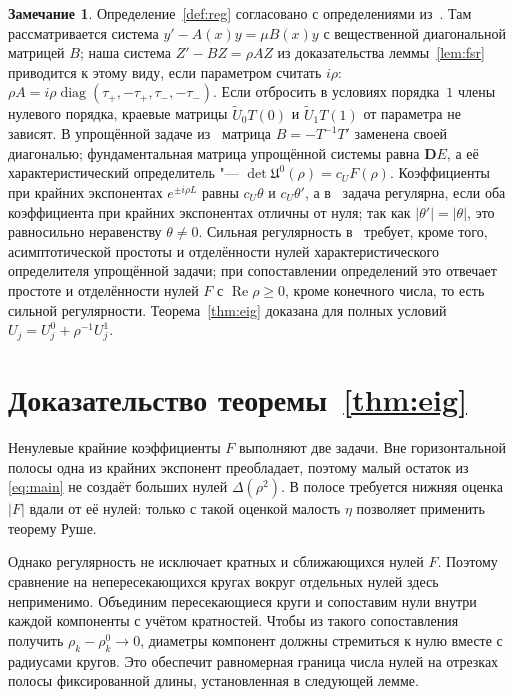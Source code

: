 \documentclass[12pt,a4paper]{article}
\numberwithin{equation}{section}
\theoremstyle{definition}
\newtheorem{remark}{Замечание}
\newcommand{\abs}[1]{\lvert#1\rvert}
\newcommand{\Ree}{\operatorname{Re}}
\newcommand{\Uf}{\mathfrak U}
\newcommand{\Dd}{\mathbf D}
\begin{document}
\begin{remark}\label{rem:Sh}
Определение~\ref{def:reg} согласовано с определениями из~\cite[с.~798]{Sh}. Там рассматривается
система $y'-A(x)y=\mu B(x)y$ с вещественной диагональной матрицей $B$; наша система
$Z'-BZ=\rho AZ$ из доказательства леммы~\ref{lem:fsr} приводится к этому виду, если параметром
считать $i\rho$: $\rho A=i\rho\operatorname{diag}(\tau_+,-\tau_+,\tau_-,-\tau_-)$. Если отбросить в
условиях порядка~$1$ члены нулевого порядка, краевые матрицы $\widetilde U_0T(0)$ и
$\widetilde U_1T(1)$ от параметра не зависят. В упрощённой задаче из~\cite{Sh} матрица
$B=-T^{-1}T'$ заменена своей диагональю; фундаментальная матрица упрощённой системы равна
$\Dd E$, а её характеристический определитель "--- $\det\Uf^0(\rho)=c_UF(\rho)$. Коэффициенты при
крайних экспонентах $e^{\pm i\rho L}$ равны $c_U\theta$ и $c_U\theta'$, а в~\cite{Sh} задача
регулярна, если оба коэффициента при крайних экспонентах отличны от нуля; так как
$\abs{\theta'}=\abs\theta$, это равносильно неравенству $\theta\ne0$. Сильная регулярность
в~\cite{Sh} требует, кроме того, асимптотической простоты и отделённости нулей
характеристического определителя упрощённой задачи; при сопоставлении определений это отвечает
простоте и отделённости нулей $F$ с $\Ree\rho\ge0$, кроме конечного числа, то есть сильной
регулярности. Теорема~\ref{thm:eig} доказана для полных условий $U_j=U_j^0+\rho^{-1}U_j^1$.
\end{remark}

\section{Доказательство теоремы~\ref{thm:eig}}

Ненулевые крайние коэффициенты $F$ выполняют две задачи. Вне горизонтальной
полосы одна из крайних экспонент преобладает, поэтому малый остаток из
\eqref{eq:main} не создаёт больших нулей $\Delta(\rho^2)$.
В полосе требуется нижняя оценка $\abs F$ вдали от её нулей: только с такой
оценкой малость $\eta$ позволяет применить теорему Руше.

Однако регулярность не исключает кратных и сближающихся нулей $F$.
Поэтому сравнение на непересекающихся кругах вокруг отдельных нулей здесь
неприменимо. Объединим пересекающиеся круги и сопоставим нули внутри каждой
компоненты с учётом кратностей. Чтобы из такого сопоставления получить
$\rho_k-\rho_k^0\to0$, диаметры компонент должны стремиться к нулю вместе
с радиусами кругов. Это обеспечит равномерная граница числа нулей на отрезках
полосы фиксированной длины, установленная в следующей лемме.
\end{document}
